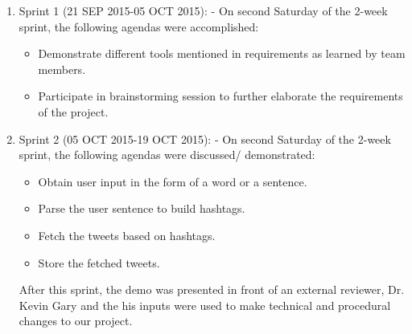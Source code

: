 \documentclass[11pt]{article}
\begin{document}
\begin{enumerate}
\item Sprint 1 (21 SEP 2015-05 OCT 2015): - On second Saturday of the 2-week sprint, the following agendas were accomplished:
\begin{itemize}
\item Demonstrate different tools mentioned in requirements as learned by team members.
\item Participate in brainstorming session to further elaborate  the requirements of the project.  
\end{itemize}
\item Sprint 2 (05 OCT 2015-19 OCT 2015): - On second Saturday of the 2-week sprint, the following agendas were discussed/ demonstrated:
\begin{itemize}
\item Obtain user input in the form of a word or a sentence.
\item Parse the user sentence to build hashtags.
\item Fetch the tweets based on hashtags.
\item Store the fetched tweets.
\end{itemize}
After this sprint, the demo was presented in front of an external reviewer, Dr. Kevin Gary and the his inputs were used to make technical and procedural changes to our project.


\end{enumerate}
\end{document}
